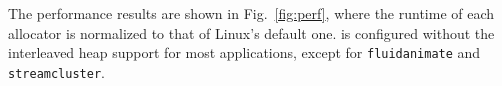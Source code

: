  
 




The performance results are shown in Fig.~\ref{fig:perf}, where the runtime of each allocator is normalized to that of Linux's default one. \NM{} is configured without the interleaved heap support for most applications, except for \texttt{fluidanimate} and \texttt{streamcluster}. 

